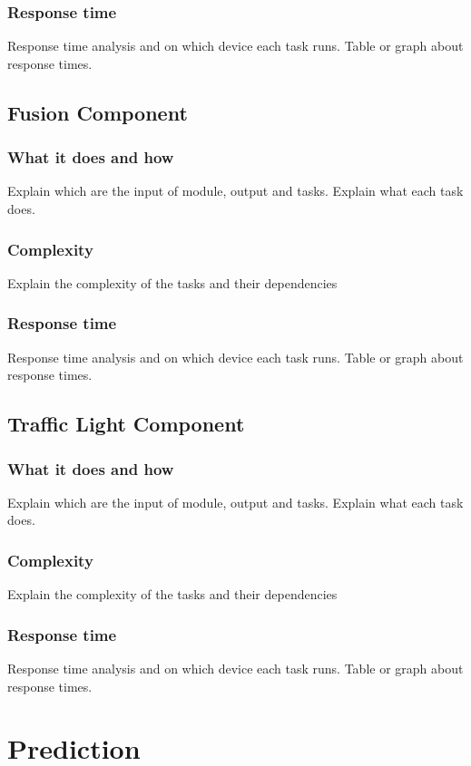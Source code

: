 \documentclass[conference]{IEEEtran}
\begin{document}
\subsubsection{Response time}
Response time analysis and on which device each task runs.
Table or graph about response times.

\subsection{Fusion Component}

\subsubsection{What it does and how}
Explain which are the input of module, output and tasks.
Explain what each task does.
\subsubsection{Complexity}
Explain the complexity of the tasks and their dependencies
\subsubsection{Response time}
Response time analysis and on which device each task runs.
Table or graph about response times.

\subsection{Traffic Light Component}

\subsubsection{What it does and how}
Explain which are the input of module, output and tasks.
Explain what each task does.
\subsubsection{Complexity}
Explain the complexity of the tasks and their dependencies
\subsubsection{Response time}
Response time analysis and on which device each task runs.
Table or graph about response times.

\section{Prediction}
\end{document}
